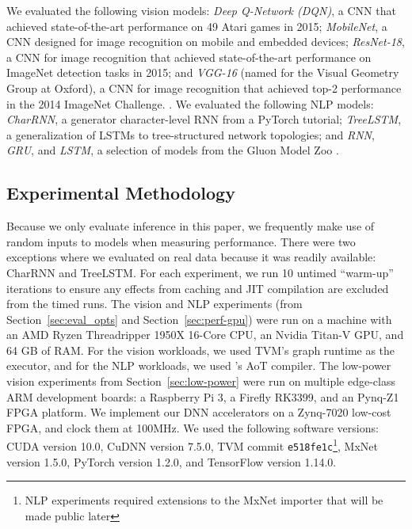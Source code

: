 We evaluated the following vision models:
  \textit{Deep Q-Network (DQN)}, a CNN that achieved state-of-the-art performance
  on 49 Atari games in 2015;
  \textit{MobileNet}, a CNN designed for image recognition on mobile and
  embedded devices;
  \textit{ResNet-18}, a CNN for image recognition that achieved state-of-the-art
  performance on ImageNet detection tasks in 2015;
  and \textit{VGG-16} (named for the Visual Geometry Group at Oxford),
    a CNN for image recognition that achieved top-2 performance in the 2014 ImageNet Challenge.
  \citep{dqn, mobilenet, resnet, vgg}.
We evaluated the following NLP models:
  \textit{CharRNN}, a generator character-level
  RNN from a PyTorch tutorial;
  \textit{TreeLSTM}, a generalization of LSTMs to
  tree-structured network topologies;
  and \textit{RNN}, \textit{GRU}, and \textit{LSTM}, a selection of models from the Gluon
  Model Zoo
  \citep{pytorch_rnn_tut, tree_lstm, gluon_model_zoo}.

\subsection{Experimental Methodology}
Because we only evaluate inference in this paper,
  we frequently make use of random inputs to models when measuring
  performance.
There were two exceptions where we evaluated on real data because
  it was readily available: CharRNN and TreeLSTM.
For each experiment,
  we run 10 untimed ``warm-up'' iterations to ensure any effects from caching and
  JIT compilation are excluded from the timed runs.
The vision and NLP experiments (from Section~\ref{sec:eval_opts} and Section~\ref{sec:perf-gpu})
  were run on a machine with an AMD Ryzen Threadripper 1950X 16-Core CPU,
  an Nvidia Titan-V GPU,
  and 64 GB of RAM.
For the vision workloads,
  we used TVM's graph runtime as the executor,
  and for the NLP workloads,
  we used \relay's AoT compiler.
The low-power vision experiments from Section~\ref{sec:low-power} were run on multiple edge-class ARM development boards: a Raspberry Pi 3, a Firefly RK3399, and an Pynq-Z1 FPGA platform.
We implement our DNN accelerators on a Zynq-7020 low-cost FPGA, and clock them at 100MHz.
We used the following software versions:
  CUDA version 10.0,
  CuDNN version 7.5.0,
  TVM commit \texttt{e518fe1c}\footnote{NLP experiments required extensions to the MxNet importer that will be made public later},
  MxNet version 1.5.0,
  PyTorch version 1.2.0,
  and TensorFlow version 1.14.0.

